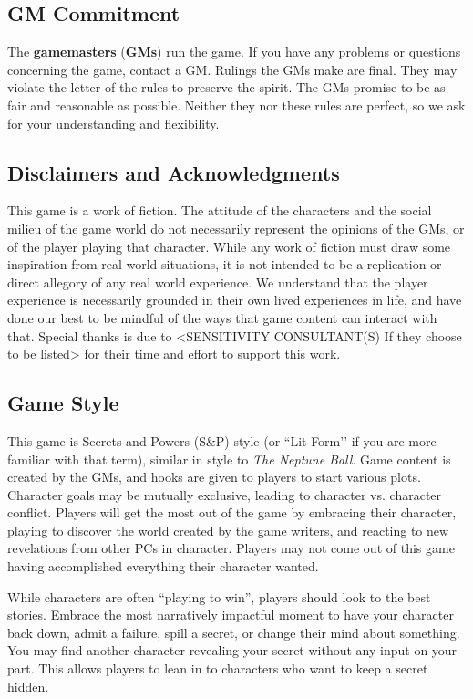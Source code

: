 \documentclass[sheet]{GL2020}
\begin{document}
\subsection{GM Commitment}
The \textbf{gamemasters} (\textbf{GMs}) run the game. If you have any problems or questions concerning the game, contact a GM. Rulings the GMs make are final.  They may violate the letter of the rules to preserve the spirit.  The GMs promise to be as fair and reasonable as possible. Neither they nor these rules are perfect, so we ask for your understanding and flexibility.

\subsection{Disclaimers and Acknowledgments}
This game is a work of fiction. The attitude of the characters and the social milieu of the game world do not necessarily represent the opinions of the GMs, or of the player playing that character. While any work of fiction must draw some inspiration from real world situations, it is not intended to be a replication or direct allegory of any real world experience. We understand that the player experience is necessarily grounded in their own lived experiences in life, and have done our best to be mindful of the ways that game content can interact with that. Special thanks is due to <SENSITIVITY CONSULTANT(S) If they choose to be listed> for their time and effort to support this work. 

\subsection{Game Style}
This game is Secrets and Powers (S\&P) style (or ``Lit Form’’ if you are more familiar with that term), similar in style to  \emph{The Neptune Ball}. Game content is created by the GMs, and hooks are given to players to start various plots. Character goals may be mutually exclusive, leading to character vs. character conflict. Players will get the most out of the game by embracing their character, playing to discover the world created by the game writers, and reacting to new revelations from other PCs in character. Players may not come out of this game having accomplished everything their character wanted. 

While characters are often “playing to win”, players should look to the best stories. Embrace the most narratively impactful moment to have your character back down, admit a failure, spill a secret, or change their mind about something. You may find another character revealing your secret without any input on your part. This allows players to lean in to characters who want to keep a secret hidden.
\end{document}
